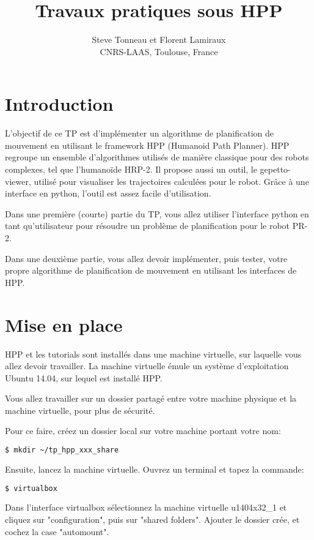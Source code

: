 \documentclass {article}
\author {Steve Tonneau et Florent Lamiraux\\
CNRS-LAAS, Toulouse, France}
\title {Travaux pratiques sous HPP}
\date {}
\begin{document}
\maketitle

\section* {Introduction}
L'objectif de ce TP est d'impl\'ementer
un algorithme de planification de mouvement en utilisant
le framework HPP (Humanoid Path Planner).
HPP regroupe un ensemble d'algorithmes utilis\'es de mani\`ere classique pour des robots complexes,
tel que l'humano\"ide HRP-2. Il propose aussi un outil, le gepetto-viewer, 
utilis\'e pour visualiser les trajectoires calcul\'ees pour le robot.
Gr\^ace \`a une interface en python, l'outil est assez facile d'utilisation.

Dans une premi\`ere (courte) partie du TP, vous allez utiliser l'interface python en tant qu'utilisateur
pour r\'esoudre un probl\`eme de planification pour le robot PR-2.

Dans une deuxi\`eme partie, vous allez devoir impl\'ementer, puis tester, votre propre algorithme de planification
de mouvement en utilisant les interfaces de HPP.

\section {Mise en place}
HPP et les tutorials sont install\'es dans une machine virtuelle, sur laquelle vous allez devoir travailler.
La machine virtuelle \'emule un syst\`eme d'exploitation Ubuntu 14.04, sur lequel est install\'e HPP.

Vous allez travailler sur un dossier partag\'e entre votre machine physique et la machine virtuelle,
pour plus de s\'ecurit\'e.

Pour ce faire, cr\'eez un dossier local sur votre machine portant votre nom:
\begin{lstlisting}[language=bash]
  $ mkdir ~/tp_hpp_xxx_share
\end{lstlisting}

Ensuite, lancez la machine virtuelle.
Ouvrez un terminal et tapez la commande:
\begin{lstlisting}[language=bash]
  $ virtualbox
\end{lstlisting}


Dans l'interface virtualbox s\'electionnez la machine virtuelle u1404x32\_1 et cliquez sur "configuration", puis sur "shared folders".
Ajouter le dossier cr\'ee, et cochez la case "automount".
\end{document}
